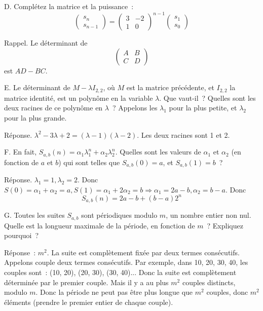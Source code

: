 \documentclass[11pt]{article}
\begin{document}
   
D. Complétez la matrice et la puissance~:
$$
\left( \begin{array}{c}
s_n \\
s_{n-1} \end{array} \right) = \left( \begin{array}{cc}
3 & -2 \\
1 & 0 \end{array} \right)^{n-1} \left( \begin{array}{c}
s_1 \\
s_0 \end{array} \right)
$$



Rappel. Le déterminant de $$\left(\begin{array}{cc} A & B \\
C & D \end{array}\right)$$ est $AD-BC$.



E. Le déterminant de $M-\lambda I_{2, 2}$, où $M$ est la matrice précédente, et $I_{2, 2}$ la matrice identité, est un polynôme en la variable $\lambda$. Que vaut-il~?  Quelles sont les deux racines de ce polynôme en $\lambda$~? Appelons les $\lambda_1$ pour la plus petite, et $\lambda_2$ pour la plus grande.

Réponse.  $\lambda^2-3\lambda+2=(\lambda-1)(\lambda-2)$. Les deux racines sont 1 et 2.


F. En fait, $S_{a,b}(n) = \alpha_1 \lambda_1^n + \alpha_2\lambda_2^n$.
Quelles sont les valeurs de $\alpha_1$ et $\alpha_2$ 
(en fonction de $a$ et $b$)  qui sont telles que
$S_{a,b}(0)=a$, et $S_{a,b}(1)=b$~?

Réponse. $\lambda_1=1, \lambda_2=2$.
Donc $S(0)= \alpha_1 + \alpha_2= a, S(1)=  \alpha_1 + 2\alpha_2=b \Rightarrow \alpha_1= 2a-b, \alpha_2=b-a$.
Donc
$$ S_{a,b}(n)= 2a-b + (b-a) 2^n$$


G. Toutes les suites $S_{a,b}$ sont périodiques modulo $m$, un nombre entier non nul.
Quelle est la longueur maximale de la période, en fonction de $m$~? Expliquez pourquoi~?


Réponse~: $m^2$. La suite est complètement fixée par deux termes consécutifs.
Appelons couple deux termes consécutifs. Par exemple, dans 10, 20, 30, 40,
les couples sont~: (10, 20), (20, 30), (30, 40)...
Donc la suite est complètement déterminée par le premier couple.
Mais il y a au plus $m^2$ couples distincts, modulo $m$.
Donc la période ne peut pas être plus longue que $m^2$ couples, donc
$m^2$ éléments (prendre le premier entier de chaque couple).
\end{document}
